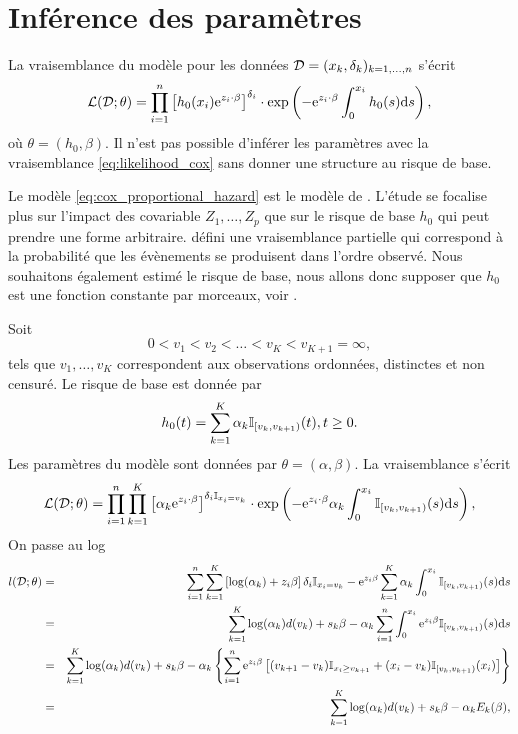 \section{Inférence des paramètres}
La vraisemblance du modèle pour les données $\mathcal{D} = (x_k,\delta_k)_{k=1,\ldots, n}$ s'écrit 
\begin{equation}\label{eq:likelihood_cox}
\mathcal{L}(\mathcal{D};\theta) =\prod_{i=1}^n \left[h_0(x_i)\mathrm{e}^{z_i\cdot \beta}\right]^{\delta_i}\cdot\exp\left(-\mathrm{e}^{z_i\cdot\beta} \int_0^{x_i}h_0(s)\text{d}s\right) ,
\end{equation}
où $\theta = (h_0,\beta)$. Il n'est pas possible d'inférer les paramètres avec la vraisemblance \eqref{eq:likelihood_cox} sans donner une structure au risque de base. 
\begin{remark}
Le modèle \eqref{eq:cox_proportional_hazard} est le modèle de \citet{Cox1972}. L'étude se focalise plus sur l'impact des covariable $Z_1,\ldots, Z_p$ que sur le risque de base $h_0$ qui peut prendre une forme arbitraire. \citet{Cox1972} défini une vraisemblance partielle qui correspond à la probabilité que les évènements se produisent dans l'ordre observé. Nous souhaitons également estimé le risque de base, nous allons donc supposer que $h_0$ est une fonction constante par morceaux, voir \citet{Breslow1975}.
\end{remark}
Soit 
$$
0<v_1<v_2<\ldots<v_K<v_{K+1}=\infty,
$$
tels que $v_1,\ldots, v_K$ correspondent aux observations ordonnées, distinctes et non censuré. Le risque de base est donnée par
$$
h_0(t)=\sum_{k=1}^{K}\alpha_k\mathbb{I}_{[v_{k}, v_{k+1})}(t),t\geq 0.
$$
Les paramètres du modèle sont données par $\theta = (\alpha, \beta)$. La vraisemblance s'écrit 
\begin{equation*}
\mathcal{L}(\mathcal{D};\theta) =\prod_{i=1}^n \prod_{k=1}^K\left[\alpha_k\mathrm{e}^{z_i\cdot \beta}\right]^{\delta_i\mathbb{I}_{x_i = v_k}}\cdot\exp\left(-\mathrm{e}^{z_i\cdot\beta}\alpha_k \int_0^{x_i}\mathbb{I}_{[v_{k}, v_{k+1})}(s)\text{d}s\right) ,
\end{equation*}
On passe au log
\begin{eqnarray*}
l(\mathcal{D};\theta)
&=& \sum_{i=1}^n\sum_{k=1}^K\left[\log(\alpha_k)+ z_i\beta\right]\delta_i\mathbb{I}_{x_i = v_k} -\mathrm{e}^{z_i\beta}\sum_{k=1}^K\alpha_k\int_0^{x_i}\mathbb{I}_{[v_{k}, v_{k+1})}(s)\text{d}s\\
&=& \sum_{k=1}^K\log(\alpha_k)d(v_k)+s_k\beta -\alpha_k\sum_{i=1}^{n}\int_0^{x_i}\mathrm{e}^{z_i\beta}\mathbb{I}_{[v_{k}, v_{k+1})}(s)\text{d}s\\
&=& \sum_{k=1}^K\log(\alpha_k)d(v_k)+s_k\beta -\alpha_k\left\{\sum_{i=1}^{n}\mathrm{e}^{z_i\beta}\left[(v_{k+1} - v_{k})\mathbb{I}_{x_i\geq v_{k+1}} +(x_i - v_{k})\mathbb{I}_{[v_{k}, v_{k+1})}(x_i)\right]\right\}\\
&=& \sum_{k=1}^K\log(\alpha_k)d(v_k)+s_k\beta -\alpha_kE_k(\beta),\\
\end{eqnarray*}
